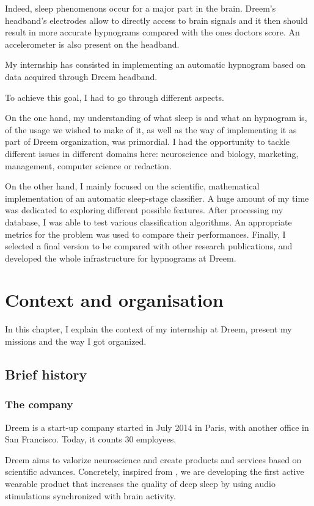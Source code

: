 \documentclass[12pt]{report}
\begin{document}
Indeed, sleep phenomenons occur for a major part in the brain. Dreem's headband's electrodes allow to directly access to brain signals and it then should result in more accurate hypnograms compared with the ones doctors score. An accelerometer is also present on the headband.

My internship has consisted in implementing an automatic hypnogram based on data acquired through Dreem headband.

To achieve this goal, I had to go through different aspects.

On the one hand, my understanding of what sleep is and what an hypnogram is, of the usage we wished to make of it, as well as the way of implementing it as part of Dreem organization, was primordial. I had the opportunity to tackle different issues in different domains here: neuroscience and biology, marketing, management, computer science or redaction.

On the other hand, I mainly focused on the scientific, mathematical implementation of an automatic sleep-stage classifier. A huge amount of my time was dedicated to exploring different possible features. After processing my database, I was able to test various classification algorithms. An appropriate metrics for the problem was used to compare their performances. Finally, I selected a final version to be compared with other research publications, and developed the whole infrastructure for hypnograms at Dreem.

\chapter{Context and organisation}

In this chapter, I explain the context of my internship at Dreem, present my missions and the way I got organized. 

\section{Brief history}

\subsection{The company}

Dreem is a start-up company started in July 2014 in Paris, with another office in San Francisco. Today, it counts 30 employees.

Dreem aims to valorize neuroscience and create products and services based on scientific advances. Concretely, inspired from \cite{ngo2013auditory}, we are developing the first active wearable product that increases the quality of deep sleep by using audio stimulations synchronized with brain activity.
\end{document}
